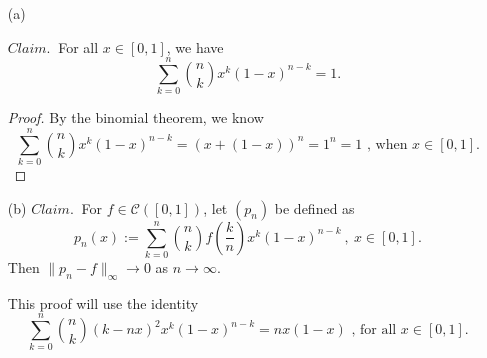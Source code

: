 \documentclass[12pt]{amsart}
\newcommand{\eq}[1]{\begin{equation*}#1\end{equation*}}
\newcommand{\qeq}[1]{\begin{equation}#1\end{equation}}
\newcommand{\<}{\langle}
\renewcommand{\>}{\rangle}
\renewcommand{\-}[1]{\overline{#1}}
\begin{document}
\begin{itemize}
    \item [(a)]
    
    $Claim.~$ For all $x \in [0, 1]$, we have
    \eq{\sum_{k = 0}^n \binom{n}{k} x^k (1-x)^{n-k} = 1.}

    \begin{proof}
        By the binomial theorem, we know 
        \eq{\sum_{k = 0}^n \binom{n}{k} x^k (1-x)^{n-k} = (x + (1-x))^n = 1^n = 1 \text{ , when } x \in [0,1].}
    \end{proof}

    \item [(b)]
    $Claim.~$ For $f \in \mathcal{C}([0,1])$, let $(p_n)$ be defined as
    \eq{p_n(x) := \sum_{k=0}^n \binom{n}{k}f\left(\frac{k}{n}\right) x^k(1-x)^{n-k}~,~ x \in [0,1].}
    Then $\|p_n - f\|_\infty \to 0$ as $n \to \infty$.

    This proof will use the identity 
    \qeq{\sum_{k=0}^{n} \binom{n}{k} (k-nx)^2x^k(1-x)^{n-k} = nx(1-x) \text{ , for all } x \in [0,1]. \label{eq:15}}


\end{itemize}
\end{document}
